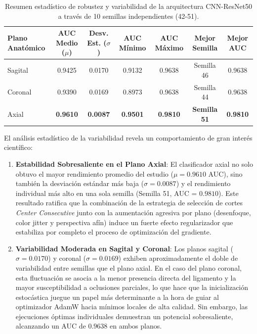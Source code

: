 \begin{table}[htbp]
\centering
\caption{Resumen estadístico de robustez y variabilidad de la arquitectura CNN-ResNet50 a través de 10 semillas independientes (42-51).}
\label{tab:multiseed_resnet50}
\begin{tabular}{lcccccc}
\hline
\textbf{Plano Anatómico} & \textbf{AUC Medio ($\mu$)} & \textbf{Desv. Est. ($\sigma$)} & \textbf{AUC Mínimo} & \textbf{AUC Máximo} & \textbf{Mejor Semilla} & \textbf{Mejor AUC} \\ \hline
Sagital                  & 0.9425                     & 0.0170                         & 0.9132              & 0.9638              & Semilla 46             & 0.9638             \\
Coronal                  & 0.9390                     & 0.0169                         & 0.8973              & 0.9638              & Semilla 44             & 0.9638             \\
Axial                    & \textbf{0.9610}            & \textbf{0.0087}                & \textbf{0.9501}     & \textbf{0.9810}     & \textbf{Semilla 51}    & \textbf{0.9810}    \\ \hline
\end{tabular}
\end{table}

El análisis estadístico de la variabilidad revela un comportamiento de gran interés científico:
\begin{enumerate}
    \item \textbf{Estabilidad Sobresaliente en el Plano Axial}: El clasificador axial no solo obtuvo el mayor rendimiento promedio del estudio ($\mu = 0.9610$ AUC), sino también la desviación estándar más baja ($\sigma = 0.0087$) y el rendimiento individual más alto en una sola semilla (Semilla 51, AUC = $0.9810$). Este resultado ratifica que la combinación de la estrategia de selección de cortes \textit{Center Consecutive} junto con la aumentación agresiva por plano (desenfoque, color jitter y perspectiva afín) induce un fuerte efecto regularizador que estabiliza por completo el proceso de optimización del gradiente.
    \item \textbf{Variabilidad Moderada en Sagital y Coronal}: Los planos sagital ($\sigma = 0.0170$) y coronal ($\sigma = 0.0169$) exhiben aproximadamente el doble de variabilidad entre semillas que el plano axial. En el caso del plano coronal, esta fluctuación se asocia a la menor presencia directa del ligamento y la mayor susceptibilidad a oclusiones parciales, lo que hace que la inicialización estocástica juegue un papel más determinante a la hora de guiar al optimizador AdamW hacia mínimos locales de alta calidad. Sin embargo, las ejecuciones óptimas individuales demuestran un potencial sobresaliente, alcanzando un AUC de $0.9638$ en ambos planos.
\end{enumerate}

